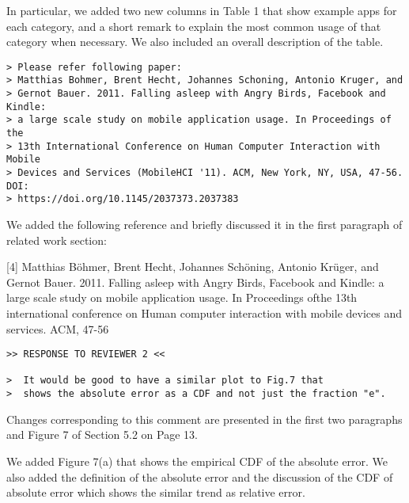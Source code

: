 In particular, we added two new columns in Table 1 that show example apps for each category, 
and a short remark to explain the most common usage of that category when necessary. 
We also included an overall description of the table.

\begin{verbatim}
> Please refer following paper:
> Matthias Bohmer, Brent Hecht, Johannes Schoning, Antonio Kruger, and
> Gernot Bauer. 2011. Falling asleep with Angry Birds, Facebook and Kindle:
> a large scale study on mobile application usage. In Proceedings of the
> 13th International Conference on Human Computer Interaction with Mobile
> Devices and Services (MobileHCI '11). ACM, New York, NY, USA, 47-56. DOI:
> https://doi.org/10.1145/2037373.2037383
\end{verbatim}

We added the following reference and briefly discussed it in the first paragraph of related work section:

[4]  Matthias B\"{o}hmer, Brent Hecht, Johannes Sch\"{o}ning, Antonio Kr\"{u}ger, and Gernot Bauer. 2011. Falling asleep with Angry Birds, Facebook and Kindle: a large scale study on mobile application usage. In Proceedings ofthe 13th international conference on Human computer interaction with mobile devices and services. ACM, 47-56

\bigskip
\begin{verbatim}
>> RESPONSE TO REVIEWER 2 <<

>  It would be good to have a similar plot to Fig.7 that
>  shows the absolute error as a CDF and not just the fraction "e".
\end{verbatim}

Changes corresponding to this comment are presented in the first two paragraphs and Figure 7 of Section 5.2 on Page 13.

We added Figure 7(a) that shows the empirical CDF of the absolute error. We also added the definition of the absolute error and the discussion of the CDF of absolute error which shows the similar trend as relative error.

